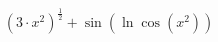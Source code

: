 \documentclass{article}
\begin{document}
\[\left({3}{\cdot}{x}^{{2}}\right)^{\frac{{1}}{{2}}}{+}\sin{\left(\ln{\cos{\left({x}^{{2}}\right)}}\right)}\]
\end{document}
